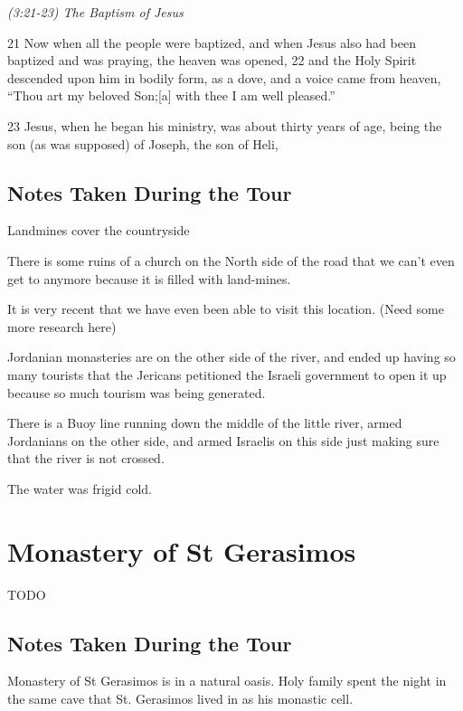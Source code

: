 \documentclass[letterpaper]{report}
\begin{document}
{\centering
	\emph{(3:21-23) The Baptism of Jesus}\\
}
\begin{multicols}{2}
21 Now when all the people were baptized, and when Jesus also had been baptized and was praying, the heaven was opened, 22 and the Holy Spirit descended upon him in bodily form, as a dove, and a voice came from heaven, “Thou art my beloved Son;[a] with thee I am well pleased.”

23 Jesus, when he began his ministry, was about thirty years of age, being the son (as was supposed) of Joseph, the son of Heli,
\end{multicols}

\subsection{Notes Taken During the Tour}
Landmines cover the countryside

There is some ruins of a church on the North side of the road that we can't even
get to anymore because it is filled with land-mines.

It is very recent that we have even been able to visit this location. (Need some more research here)

Jordanian monasteries are on the other side of the river,
and ended up having so many tourists that the Jericans petitioned the Israeli government to open it up because so much tourism was being generated.

There is a Buoy line running down the middle of the little river, armed Jordanians on the other side,
and armed Israelis on this side just making sure that the river is not crossed.

The water was frigid cold.

\clearpage
\section{Monastery of St Gerasimos}
\begin{multicols}{2}
	\mbox{}TODO
\end{multicols}

\subsection{Notes Taken During the Tour}
Monastery of St Gerasimos is in a natural oasis.
Holy family spent the night in the same cave that St. Gerasimos lived in as his monastic cell.
\end{document}
